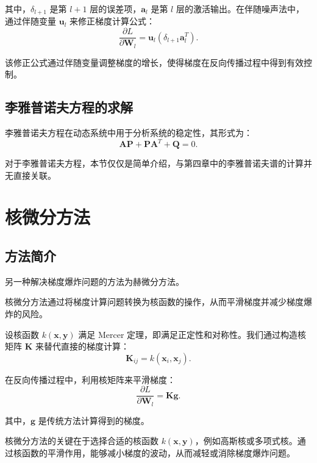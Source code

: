 其中，\( \delta_{l+1} \) 是第 \( l+1 \) 层的误差项，\( \mathbf{a}_l \) 是第 \( l \) 层的激活输出。在伴随噪声法中，通过伴随变量 \( \mathbf{u}_l \) 来修正梯度计算公式：
\begin{equation}
  \frac{\partial L}{\partial \mathbf{W}_l} = \mathbf{u}_l (\delta_{l+1} \mathbf{a}_l^T).
\end{equation}

该修正公式通过伴随变量调整梯度的增长，使得梯度在反向传播过程中得到有效控制。

\subsection{李雅普诺夫方程的求解}

李雅普诺夫方程在动态系统中用于分析系统的稳定性，其形式为：
\begin{equation}
  \mathbf{A} \mathbf{P} + \mathbf{P} \mathbf{A}^T + \mathbf{Q} = 0.
\end{equation}

对于李雅普诺夫方程，本节仅仅是简单介绍，与第四章中的李雅普诺夫谱的计算并无直接关联。

\section{核微分方法}

\subsection{方法简介}

另一种解决梯度爆炸问题的方法为赫微分方法。

核微分方法通过将梯度计算问题转换为核函数的操作，从而平滑梯度并减少梯度爆炸的风险。

设核函数 \(k(\mathbf{x}, \mathbf{y})\) 满足 Mercer 定理，即满足正定性和对称性。我们通过构造核矩阵 \(\mathbf{K}\) 来替代直接的梯度计算：
\begin{equation}
  \mathbf{K}_{ij} = k(\mathbf{x}_i, \mathbf{x}_j).
\end{equation}

在反向传播过程中，利用核矩阵来平滑梯度：
\begin{equation}
  \frac{\partial L}{\partial \mathbf{W}_l} = \mathbf{K} \mathbf{g}.
\end{equation}

其中，\(\mathbf{g}\) 是传统方法计算得到的梯度。

核微分方法的关键在于选择合适的核函数 \(k(\mathbf{x}, \mathbf{y})\)，例如高斯核或多项式核。通过核函数的平滑作用，能够减小梯度的波动，从而减轻或消除梯度爆炸问题。


